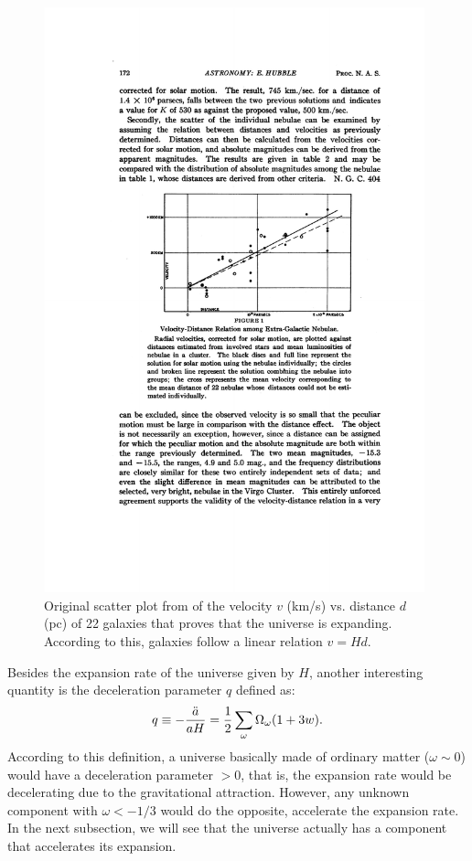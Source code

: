 \begin{figure}
\centering
\includegraphics[width=110mm]{./plots/Hubblediagram.pdf}
\caption{Original scatter plot from \citet{Hubble1929} of the velocity $v$ (km/s) vs. distance $d$ (pc) of 22 galaxies that proves that the universe is expanding. According to this, galaxies follow a linear relation $v=Hd$.} 
\label{fig:hubble_diagram}
\end{figure}

Besides the expansion rate of the universe given by $H$, another interesting quantity is the deceleration parameter $q$ defined as:
\begin{equation}
q \equiv -{\ddot{a} \over aH} = {1 \over 2} \sum_\omega \Omega_{\omega}{(1+3w)}.
\label{eq:deceleration}
\end{equation} 
According to this definition, a universe basically made of ordinary matter ($\omega \sim 0$) would have a deceleration parameter $>0$, that is, the expansion rate would be decelerating due to the gravitational attraction. However, any unknown component with $\omega < -1/3$ would do the opposite, accelerate the expansion rate. In the next subsection, we will see that the universe actually has a component that accelerates its expansion.

